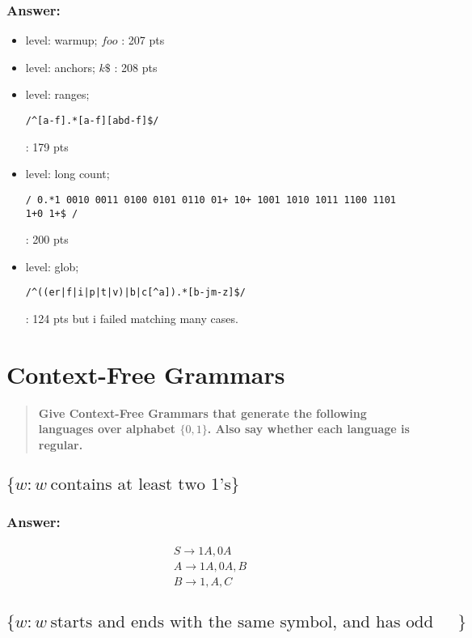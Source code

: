 \documentclass[titlepage]{article}\usepackage[]{graphicx}\usepackage[]{color}
\begin{document}
\subsubsection*{Answer:}
\begin{itemize}
  \item level: warmup; \( foo \) : 207 pts
  \item level: anchors; \( k\$ \) : 208 pts
  \item level: ranges; \begin{verbatim}/^[a-f].*[a-f][abd-f]$/ \end{verbatim}: 179 pts
  \item level: long count; \begin{verbatim}/ 0.*1 0010 0011 0100 0101 0110 01+ 10+ 1001 1010 1011 1100 1101 1+0 1+$ / \end{verbatim} : 200 pts
  \item level: glob; \begin{verbatim}/^((er|f|i|p|t|v)|b|c[^a]).*[b-jm-z]$/\end{verbatim}: 124 pts but i failed matching many cases.
\end{itemize}


\section{Context-Free Grammars}
\begin{quote}
  \textbf{Give Context-Free Grammars that generate the following languages over
    alphabet \(\{0,1\}\). Also say whether each language is regular.}
\end{quote}
\subsection{\(\{w : w \ \mbox{contains at least two 1's}\}\)}
\subsubsection*{Answer:}
\begin{align*}
S \to 1A, 0A \\
A \to 1A, 0A, B \\
B \to 1, A, C
\end{align*}
\subsection{\(\{w : w \ \mbox{starts and ends with the same symbol, and has odd length}\}\)}
\end{document}
